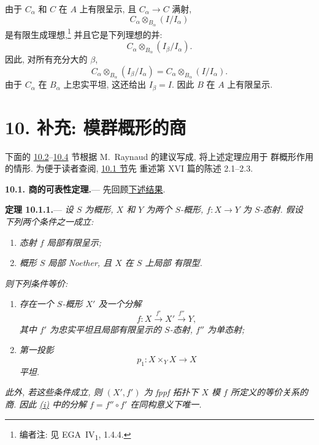 由于 \(C_\alpha\) 和 \(C\) 在 \(A\) 上有限呈示,
且 \(C_\alpha\to C\) 满射,
\[
  C_\alpha\otimes_{B_\alpha}(I/I_\alpha)
\]
是有限生成理想,\footnote{\label{note:sga3-V-48}编者注:
见 EGA~IV\textsubscript{1}, 1.4.4.} 并且它是下列理想的并:
\[
  C_\alpha\otimes_{B_\alpha}(I_\beta/I_\alpha).
\]
因此, 对所有充分大的 \(\beta\),
\[
  C_\alpha\otimes_{B_\alpha}(I_\beta/I_\alpha)
  =
  C_\alpha\otimes_{B_\alpha}(I/I_\alpha).
\]
由于 \(C_\alpha\) 在 \(B_\alpha\) 上忠实平坦, 这还给出
\(I_\beta=I\). 因此 \(B\) 在 \(A\) 上有限呈示.

\bigskip
{}\label{sec:sga3-V-10}%
\section*{10. 补充: 模群概形的商}

下面的 \hyperref[sec:sga3-V-10.2]{10.2}--\hyperref[sec:sga3-V-10.4]{10.4} 节根据
M.~Raynaud 的建议写成, 将上述定理应用于
群概形作用的情形. 为便于读者查阅, \hyperref[sga3:v:paragraph:10-1]{10.1 节}先
重述第 XVI 篇的陈述 2.1--2.3.

\medskip
{}\label{subsec:sga3-V-10.1}%
\noindent{}\textbf{10.1. 商的可表性定理.}---%
先回顾\hyperref[thm:sga3-V-10.1.1]{下述结果}.

\medskip
{}\label{thm:sga3-V-10.1.1}%
\noindent\textbf{定理 10.1.1.}---%
\textit{设 \(S\) 为概形, \(X\) 和 \(Y\) 为两个
\(S\)-概形, \(f:X\to Y\) 为 \(S\)-态射. 假设
下列两个条件之一成立:}
\begin{enumerate}
\item[\(\alpha\))]\label{thm:sga3-V-10.1.1-alpha}%
\textit{态射 \(f\) 局部有限呈示;}
\item[\(\beta\))]\label{thm:sga3-V-10.1.1-beta}%
\textit{概形 \(S\) 局部 Noether, 且 \(X\) 在 \(S\) 上局部
有限型.}
\end{enumerate}
\textit{则下列条件等价:}
\begin{enumerate}
\item[(i)]\label{thm:sga3-V-10.1.1-i}%
\textit{存在一个 \(S\)-概形 \(X'\) 及一个分解}
\[
  f:X\xrightarrow{\,f'\,}X'\xrightarrow{\,f''\,}Y,
\]
\textit{其中 \(f'\) 为忠实平坦且局部有限呈示的
\(S\)-态射, \(f''\) 为单态射;}

\item[(ii)]\label{thm:sga3-V-10.1.1-ii}%
\textit{第一投影}
\[
  p_1:X\times_Y X\longrightarrow X
\]
\textit{平坦.}
\end{enumerate}
\textit{此外, 若这些条件成立, 则 \((X',f')\) 为 fppf 拓扑下
\(X\) 模 \(f\) 所定义的等价关系的商.
因此 \hyperref[thm:sga3-V-10.1.1-i]{(i)} 中的分解 \(f=f''\circ f'\)
在同构意义下唯一.}

